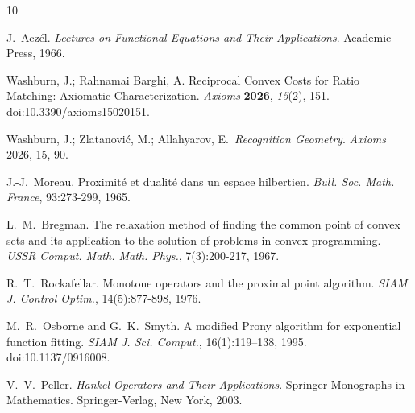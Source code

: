 \documentclass[11pt,reqno]{amsart}
\theoremstyle{definition}
\theoremstyle{remark}
\newcommand{\1}{\mathbf{1}}
\begin{document}
\begin{thebibliography}{10}

J.~Acz\'el.
\newblock \emph{Lectures on Functional Equations and Their Applications}.
\newblock Academic Press, 1966.

Washburn, J.; Rahnamai Barghi, A.
\newblock Reciprocal Convex Costs for Ratio Matching: Axiomatic Characterization.
\newblock \emph{Axioms} \textbf{2026}, \emph{15}(2), 151. doi:10.3390/axioms15020151.

Washburn, J.; Zlatanovi\'c, M.; Allahyarov, E.\ \emph{Recognition Geometry}. \emph{Axioms} 2026, 15, 90.

J.-J.~Moreau.
\newblock Proximit\'e et dualit\'e dans un espace hilbertien.
\newblock \emph{Bull. Soc. Math. France}, 93:273-299, 1965.

L.~M.~Bregman.
\newblock The relaxation method of finding the common point of convex sets and its application to the solution of problems in convex programming.
\newblock \emph{USSR Comput. Math. Math. Phys.}, 7(3):200-217, 1967.

R.~T.~Rockafellar.
\newblock Monotone operators and the proximal point algorithm.
\newblock \emph{SIAM J. Control Optim.}, 14(5):877-898, 1976.


M.~R.~Osborne and G.~K.~Smyth.
\newblock A modified {P}rony algorithm for exponential function fitting.
\newblock \emph{SIAM J. Sci. Comput.}, 16(1):119--138, 1995. doi:10.1137/0916008.

V.~V.~Peller.
\newblock \emph{Hankel Operators and Their Applications}.
\newblock Springer Monographs in Mathematics. Springer-Verlag, New York, 2003.

\end{thebibliography}
\end{document}
